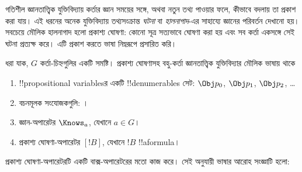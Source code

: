\documentclass[../../../include/open-logic-section]{subfiles}
\begin{document}


গতিশীল জ্ঞানতাত্ত্বিক যুক্তিবিদ্যায় কর্তার জ্ঞান সময়ের সঙ্গে, অথবা নতুন তথ্য পাওয়ার ফলে, কীভাবে বদলায় তা প্রকাশ করা যায়। এই ধরনের অনেক যুক্তিবিদ্যায় তথ্যসংক্রান্ত \emph{ঘটনা} বা \emph{হালনাগাদ}-এর সাহায্যে জ্ঞানের পরিবর্তন দেখানো হয়। সবচেয়ে মৌলিক হালনাগাদ হলো প্রকাশ্য ঘোষণা: কোনো সূত্র সত্যভাবে ঘোষণা করা হয় এবং সব কর্তা একসঙ্গে সেই ঘটনা প্রত্যক্ষ করে। এটি প্রকাশ করতে ভাষা নিম্নরূপে প্রসারিত করি।

\begin{defn}
ধরা যাক, $G$ কর্তা-চিহ্নগুলির একটি সমষ্টি। প্রকাশ্য ঘোষণাসহ বহু-কর্তা জ্ঞানতাত্ত্বিক যুক্তিবিদ্যার মৌলিক ভাষায় থাকে
\begin{enumerate}
  \item !!{propositional variable}sর একটি !!{denumerable}s সেট: $\Obj
    p_0$, $\Obj p_1$, $\Obj p_2$, \dots
  \item বচনমূলক সংযোজকগুলি: \startycommalist
  ।
    \item জ্ঞান-অপারেটর $\Knows_a$, যেখানে $a \in G$।
  \item প্রকাশ্য ঘোষণা-অপারেটর $[!B]$, যেখানে $!B$ !!a{formula}।
\end{enumerate}
\end{defn}

প্রকাশ্য ঘোষণা-অপারেটরটি একটি বাক্স-অপারেটরের মতো কাজ করে। সেই অনুযায়ী ভাষার আরোহ সংজ্ঞাটি হলো:
\end{document}

